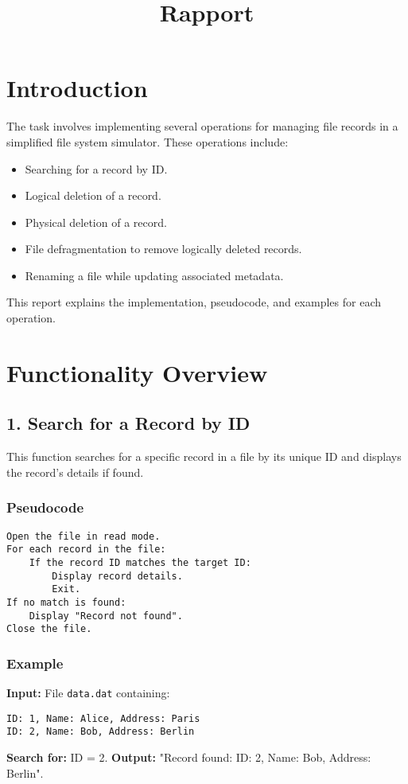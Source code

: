 \documentclass[a4paper, 12pt]{article}
\title{Rapport}
\author{}
\date{}
\begin{document}
\maketitle

\section*{Introduction}
The task involves implementing several operations for managing file records in a simplified file system simulator. These operations include:

\begin{itemize}
    \item Searching for a record by ID.
    \item Logical deletion of a record.
    \item Physical deletion of a record.
    \item File defragmentation to remove logically deleted records.
    \item Renaming a file while updating associated metadata.
\end{itemize}

This report explains the implementation, pseudocode, and examples for each operation.

\section*{Functionality Overview}

\subsection*{1. Search for a Record by ID}
This function searches for a specific record in a file by its unique ID and displays the record's details if found.

\subsubsection*{Pseudocode}
\begin{verbatim}
Open the file in read mode.
For each record in the file:
    If the record ID matches the target ID:
        Display record details.
        Exit.
If no match is found:
    Display "Record not found".
Close the file.
\end{verbatim}

\subsubsection*{Example}
\textbf{Input:} File \texttt{data.dat} containing:
\begin{verbatim}
ID: 1, Name: Alice, Address: Paris
ID: 2, Name: Bob, Address: Berlin
\end{verbatim}
\textbf{Search for:} ID = 2.\newline
\textbf{Output:} "Record found: ID: 2, Name: Bob, Address: Berlin".
\end{document}

